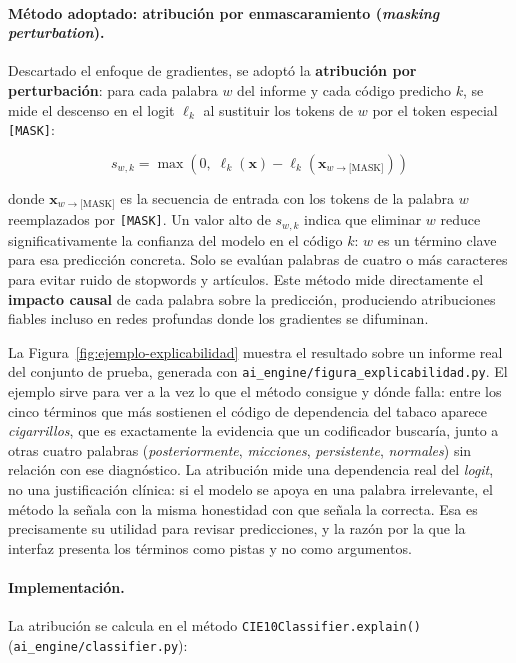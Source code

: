 \paragraph{Método adoptado: atribución por enmascaramiento (\emph{masking perturbation}).}
Descartado el enfoque de gradientes, se adoptó la \textbf{atribución por perturbación}: para cada palabra $w$ del informe y cada código predicho $k$, se mide el descenso en el logit $\ell_k$ al sustituir los tokens de $w$ por el token especial \texttt{[MASK]}:

\begin{equation}
 s_{w,k} = \max\!\left(0,\; \ell_k(\mathbf{x}) - \ell_k(\mathbf{x}_{w \to \text{[MASK]}})\right)
\end{equation}

donde $\mathbf{x}_{w \to \text{[MASK]}}$ es la secuencia de entrada con los tokens de la palabra $w$ reemplazados por \texttt{[MASK]}. Un valor alto de $s_{w,k}$ indica que eliminar $w$ reduce significativamente la confianza del modelo en el código $k$: $w$ es un término clave para esa predicción concreta. Solo se evalúan palabras de cuatro o más caracteres para evitar ruido de stopwords y artículos. Este método mide directamente el \textbf{impacto causal} de cada palabra sobre la predicción, produciendo atribuciones fiables incluso en redes profundas donde los gradientes se difuminan.

La Figura~\ref{fig:ejemplo-explicabilidad} muestra el resultado sobre un informe real del conjunto de prueba, generada con \texttt{ai\_engine/figura\_explicabilidad.py}. El ejemplo sirve para ver a la vez lo que el método consigue y dónde falla: entre los cinco términos que más sostienen el código de dependencia del tabaco aparece \emph{cigarrillos}, que es exactamente la evidencia que un codificador buscaría, junto a otras cuatro palabras (\emph{posteriormente}, \emph{micciones}, \emph{persistente}, \emph{normales}) sin relación con ese diagnóstico. La atribución mide una dependencia real del \emph{logit}, no una justificación clínica: si el modelo se apoya en una palabra irrelevante, el método la señala con la misma honestidad con que señala la correcta. Esa es precisamente su utilidad para revisar predicciones, y la razón por la que la interfaz presenta los términos como pistas y no como argumentos.



\paragraph{Implementación.}
La atribución se calcula en el método \texttt{CIE10Classifier.explain()} (\texttt{ai\_engine/classifier.py}):

